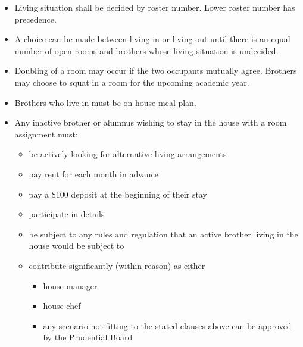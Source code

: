 \documentclass{article}
\begin{document}
\begin{itemize}
    \item Living situation shall be decided by roster number. Lower roster number has precedence. 
    \item A choice can be made between living in or living out until there is an equal number of open rooms and brothers whose living situation is undecided.
    \item Doubling of a room may occur if the two occupants mutually agree. Brothers may choose to squat in a room for the upcoming academic year.
    \item Brothers who live-in must be on house meal plan.
    \item Any inactive brother or alumnus wishing to stay in the house with a room assignment must:
    \begin{itemize}
        \item be actively looking for alternative living arrangements
        \item pay rent for each month in advance
        \item pay a \$100 deposit at the beginning of their stay
        \item participate in details
        \item be subject to any rules and regulation that an active brother living in the house would be subject to
        \item contribute significantly (within reason) as either
        \begin{itemize}
            \item house manager
            \item house chef
            \item any scenario not fitting to the stated clauses above can be approved by the Prudential Board
        \end{itemize}
    \end{itemize}
\end{itemize}
\end{document}
